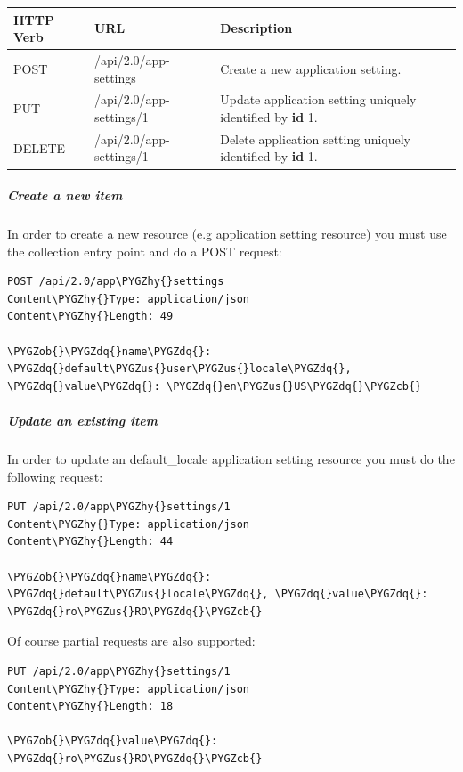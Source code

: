 \documentclass[letterpaper,10pt,english]{sphinxmanual}
\def\PYGZus{\char`\_}
\def\PYGZob{\char`\{}
\def\PYGZcb{\char`\}}
\def\PYGZhy{\char`\-}
\def\PYGZdq{\char`\"}
\begin{document}
\begin{tabulary}{\linewidth}{|L|L|L|}
\hline

\textbf{HTTP Verb}
 & 
\textbf{URL}
 & 
\textbf{Description}
\\\hline

POST
 & 
/api/2.0/app-settings
 & 
Create a new application setting.
\\\hline

PUT
 & 
/api/2.0/app-settings/1
 & 
Update application setting uniquely identified by \textbf{id} 1.
\\\hline

DELETE
 & 
/api/2.0/app-settings/1
 & 
Delete application setting uniquely identified by \textbf{id} 1.
\\\hline
\end{tabulary}



\subparagraph{Create a new item}
\label{features/roa/rest_standard:create-a-new-item}
In order to create a new resource (e.g application setting resource) you must use the collection entry point and do a
POST request:

\begin{Verbatim}[commandchars=\\\{\}]
POST /api/2.0/app\PYGZhy{}settings
Content\PYGZhy{}Type: application/json
Content\PYGZhy{}Length: 49

\PYGZob{}\PYGZdq{}name\PYGZdq{}: \PYGZdq{}default\PYGZus{}user\PYGZus{}locale\PYGZdq{}, \PYGZdq{}value\PYGZdq{}: \PYGZdq{}en\PYGZus{}US\PYGZdq{}\PYGZcb{}
\end{Verbatim}


\subparagraph{Update an existing item}
\label{features/roa/rest_standard:update-an-existing-item}
In order to update an default\_locale application setting resource you must do the following request:

\begin{Verbatim}[commandchars=\\\{\}]
PUT /api/2.0/app\PYGZhy{}settings/1
Content\PYGZhy{}Type: application/json
Content\PYGZhy{}Length: 44

\PYGZob{}\PYGZdq{}name\PYGZdq{}: \PYGZdq{}default\PYGZus{}locale\PYGZdq{}, \PYGZdq{}value\PYGZdq{}: \PYGZdq{}ro\PYGZus{}RO\PYGZdq{}\PYGZcb{}
\end{Verbatim}

Of course partial requests are also supported:

\begin{Verbatim}[commandchars=\\\{\}]
PUT /api/2.0/app\PYGZhy{}settings/1
Content\PYGZhy{}Type: application/json
Content\PYGZhy{}Length: 18

\PYGZob{}\PYGZdq{}value\PYGZdq{}: \PYGZdq{}ro\PYGZus{}RO\PYGZdq{}\PYGZcb{}
\end{Verbatim}
\end{document}
